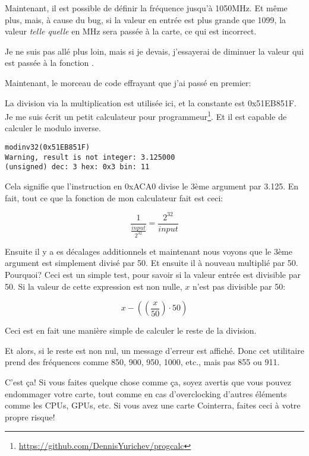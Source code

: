 Maintenant, il est possible de définir la fréquence jusqu'à 1050MHz. Et même plus,
mais, à cause du bug, si la valeur en entrée est plus grande que 1099, la valeur
\emph{telle quelle} en MHz sera passée à la carte, ce qui est incorrect.

Je ne suis  pas allé plus loin, mais si je devais, j'essayerai de diminuer la valeur
qui est passée à la fonction .

Maintenant, le morceau de code effrayant que j'ai passé en premier:



La division via la multiplication est utilisée ici, et la constante est 0x51EB851F.
Je me suis écrit un petit calculateur pour programmeur\footnote{\url{https://github.com/DennisYurichev/progcalc}}.
Et il est capable de calculer le modulo inverse.

\begin{lstlisting}
modinv32(0x51EB851F)
Warning, result is not integer: 3.125000
(unsigned) dec: 3 hex: 0x3 bin: 11
\end{lstlisting}

Cela signifie que l'instruction  en 0xACA0 divise le 3ème argument par 3.125.
En fait, tout ce que la fonction  de mon calculateur fait est ceci:

\[
\frac{1}{\frac{input}{2^{32}}} = \frac{2^{32}}{input}
\]

Ensuite il y a es décalages additionnels et maintenant nous voyons que le 3ème argument
est simplement divisé par 50.
Et ensuite il à nouveau multiplié par 50.
Pourquoi?
Ceci est un simple test, pour savoir si la valeur entrée est divisible par 50.
Si la valeur de cette expression est non nulle, $x$ n'est pas divisible par 50:

\[
x-((\frac{x}{50}) \cdot 50)
\]

Ceci est en fait une manière simple de calculer le reste de la division.

Et alors, si le reste est non nul, un message d'erreur est affiché.
Donc cet utilitaire prend des fréquences comme 850, 900, 950, 1000, etc., mais pas 855 ou 911.

C'est ça! Si vous faites quelque chose comme ça, soyez avertis que vous pouvez endommager
votre carte, tout comme en cas d'overclocking d'autres éléments comme les \ac{CPU}s,
\ac{GPU}s, etc.
Si vous avez une carte Cointerra, faites ceci à votre propre risque!

